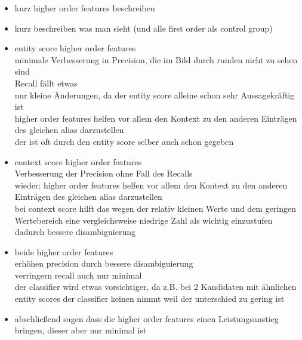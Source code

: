 \begin{itemize}
	\item kurz higher order features beschreiben
	\item kurz beschreiben was man sieht (und alle first order als control group)
	\item entity score higher order features\\
		minimale Verbesserung in Precision, die im Bild durch runden nicht zu sehen sind\\
		Recall fällt etwas\\
		nur kleine Änderungen, da der entity score alleine schon sehr Aussagekräftig ist\\
		higher order features helfen vor allem den Kontext zu den anderen Einträgen des gleichen alias darzustellen\\
		der ist oft durch den entity score selber auch schon gegeben
	\item context score higher order features\\
		Verbesserung der Precision ohne Fall des Recalls\\
		wieder: higher order features helfen vor allem den Kontext zu den anderen Einträgen des gleichen alias darzustellen\\
		bei context score hilft das wegen der relativ kleinen Werte und dem geringen Wertebereich eine vergleichsweise niedrige Zahl als wichtig einzustufen\\
		dadurch bessere disambiguierung
	\item beide higher order features\\
		erhöhen precision durch bessere disambiguierung\\
		verringern recall auch nur minimal\\
		der classifier wird etwas vorsichtiger, da z.B. bei 2 Kandidaten mit ähnlichen entity scores der classifier keinen nimmt weil der unterschied zu gering ist
	\item abschließend sagen dass die higher order features einen Leistungsanstieg bringen, dieser aber nur minimal ist
\end{itemize}

